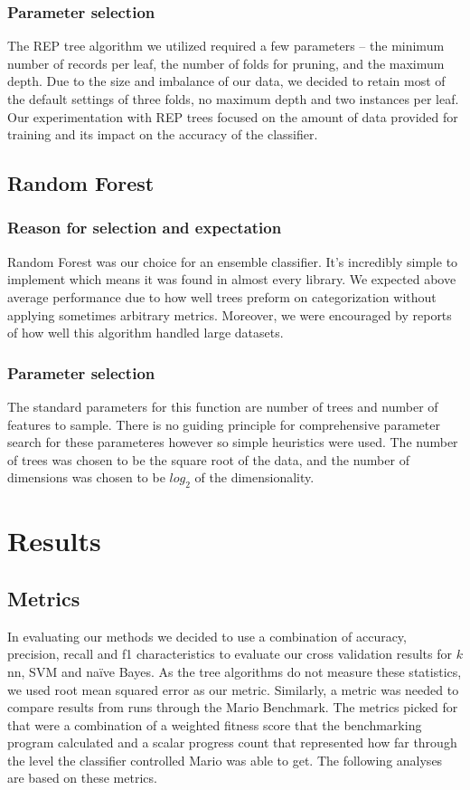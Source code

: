 \documentclass[]{article}   %
\begin{document}
\subsubsection{Parameter selection}
The REP tree algorithm we utilized required a few parameters -- the minimum number of records per leaf, the number 
of folds for pruning, and the maximum depth. Due to the size and imbalance of our data, we decided to retain most 
of the default settings of three folds, no maximum depth and two instances per leaf. Our experimentation with REP 
trees focused on the amount of data provided for training and its impact on the accuracy of the classifier.

\subsection{Random Forest}
\subsubsection{Reason for selection and expectation}
Random Forest was our choice for an ensemble classifier.  It's incredibly simple to implement which means it was found in almost every library.  We expected above average performance due to how well trees preform on categorization without applying sometimes arbitrary metrics.  Moreover, we were encouraged by reports of how well this algorithm handled large datasets.

\subsubsection{Parameter selection}
The standard parameters for this function are number of trees and number of features to sample.  There is no guiding principle for comprehensive parameter search for these parameteres however so simple heuristics were used.  The number of trees was chosen to be the square root of the data, and the number of dimensions was chosen to be $log_2$ of the dimensionality.

\section{Results}
\label{sec:results}
\subsection{Metrics}
In evaluating our methods we decided to use a combination of accuracy, precision, recall and f1 characteristics to 
evaluate our cross validation results for $k$nn, SVM and na\"{i}ve Bayes. As the tree algorithms do not measure these
statistics, we used root mean squared error as our metric.
\newline\newline
Similarly, a metric was needed to compare results from runs through the Mario 
Benchmark. The metrics picked for that were a combination of a weighted fitness score that the benchmarking program 
calculated and a scalar progress count that represented how far through the level the classifier controlled Mario was 
able to get. The following analyses are based on these metrics.
\end{document}
